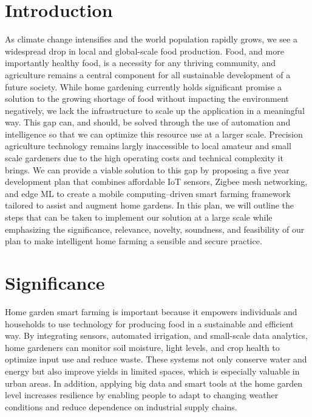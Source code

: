 \documentclass{sigchi}
\begin{document}
\section{Introduction}

As climate change intensifies and the world population rapidly grows, we see a widespread drop in local and global-scale food production. Food, and more importantly healthy food, is a necessity for any thriving community, and agriculture remains a central component for all sustainable development of a future society. While home gardening currently holds significant promise a solution to the growing shortage of food without impacting the environment negatively, we lack the infrastructure to scale up the application in a meaningful way. This gap can, and should, be solved through the use of automation and intelligence so that we can optimize this resource use at a larger scale. Precision agriculture technology remains largly inaccessible to local amateur and small scale gardeners due to the high operating costs and technical complexity it brings. We can provide a viable solution to this gap by proposing a five year development plan that combines affordable IoT sensors, Zigbee mesh networking, and edge ML to create a mobile computing–driven smart farming framework tailored to assist and augment home gardens.  In this plan, we will outline the steps that can be taken to implement our solution at a large scale while emphasizing the significance, relevance, novelty, soundness, and feasibility of our plan to make intelligent home farming a sensible and secure practice.


\section{Significance}

Home garden smart farming is important because it empowers individuals and households to use technology for producing food in a sustainable and efficient way. By integrating sensors, automated irrigation, and small-scale data analytics, home gardeners can monitor soil moisture, light levels, and crop health to optimize input use and reduce waste\cite{wolfert2017big}. These systems not only conserve water and energy but also improve yields in limited spaces, which is especially valuable in urban areas. In addition, applying big data and smart tools at the home garden level increases resilience by enabling people to adapt to changing weather conditions and reduce dependence on industrial supply chains\cite{elbilali2018smart}.
\end{document}
